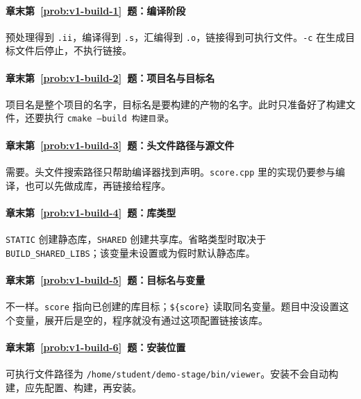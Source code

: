 \paragraph*{章末第~\ref{prob:v1-build-1}~题：编译阶段}
\begin{solution}
预处理得到 \texttt{.ii}，编译得到 \texttt{.s}，汇编得到 \texttt{.o}，链接得到可执行文件。\texttt{-c} 在生成目标文件后停止，不执行链接。
\end{solution}

\paragraph*{章末第~\ref{prob:v1-build-2}~题：项目名与目标名}
\begin{solution}
项目名是整个项目的名字，目标名是要构建的产物的名字。此时只准备好了构建文件，还要执行 \texttt{cmake --build 构建目录}。
\end{solution}

\paragraph*{章末第~\ref{prob:v1-build-3}~题：头文件路径与源文件}
\begin{solution}
需要。头文件搜索路径只帮助编译器找到声明。\texttt{score.cpp} 里的实现仍要参与编译，也可以先做成库，再链接给程序。
\end{solution}

\paragraph*{章末第~\ref{prob:v1-build-4}~题：库类型}
\begin{solution}
\texttt{STATIC} 创建静态库，\texttt{SHARED} 创建共享库。省略类型时取决于 \texttt{BUILD\_SHARED\_LIBS}；该变量未设置或为假时默认静态库。
\end{solution}

\paragraph*{章末第~\ref{prob:v1-build-5}~题：目标名与变量}
\begin{solution}
不一样。\texttt{score} 指向已创建的库目标；\texttt{\$\{score\}} 读取同名变量。题目中没设置这个变量，展开后是空的，程序就没有通过这项配置链接该库。
\end{solution}

\paragraph*{章末第~\ref{prob:v1-build-6}~题：安装位置}
\begin{solution}
可执行文件路径为 \texttt{/home/student/demo-stage/bin/viewer}。安装不会自动构建，应先配置、构建，再安装。
\end{solution}

